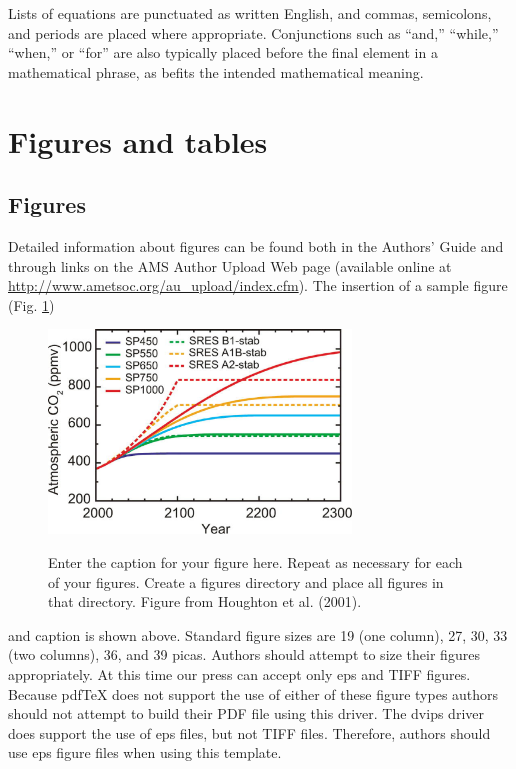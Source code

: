 \documentclass[12pt]{article}
\begin{document}
Lists of equations are punctuated as written English, and commas, semicolons, and periods are placed where appropriate. Conjunctions such as ``and,'' ``while,'' ``when,'' or ``for'' are also typically placed before the final element in a mathematical phrase, as befits the intended mathematical meaning.   

\section{Figures and tables}

\subsection{Figures}
Detailed information about figures can be found both in the Authors'
Guide and through links on the AMS Author Upload Web page (available
online at \url{http://www.ametsoc.org/au_upload/index.cfm}). The insertion
of a sample figure (Fig. \ref{f1}) 
\begin{figure}[t]
  \noindent\includegraphics[width=19pc,angle=0]{./figures/figure01.eps}\\
  \caption{Enter the caption for your figure here.  Repeat as
  necessary for each of your figures. Create a figures directory and
  place all figures in that directory. Figure from Houghton et al. (2001).}\label{f1}
\end{figure}
and caption is shown above. Standard figure sizes are 
19 (one column), 27, 30, 33 (two columns), 36, and 39 picas. Authors should attempt to size their figures appropriately. At this time our press can accept only eps and TIFF figures.  Because pdfTeX does not support the use of either of these figure types authors should not attempt to build their PDF file using this driver.  The dvips driver does support the use of eps files, but not TIFF files.  Therefore, authors should use eps figure files when using this template.
\end{document}
